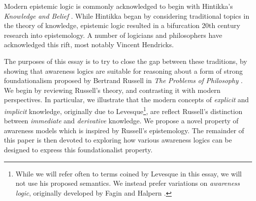 Modern epistemic logic is commonly acknowledged to begin with
Hintikka's \emph{Knowledge and Belief}
\cite{hintikka_knowledge_1969}. While Hintikka began by considering
traditional topics in the theory of knowledge, epistemic logic
resulted in a bifurcation 20th century research into epistemology.  A number of
logicians and philosophers have acknowledged this rift, most notably
Vincent Hendricks\cite{hendricks_wheres_2006,hendricks_mainstream_2006}.

The purposes of this essay is to try to close the gap between these
traditions, by showing that awareness logics are suitable for
reasoning about a form of strong foundationalism proposed
by Bertrand Russell in \emph{The Problems of Philosophy}
\cite{russell_problems_1936}.  We begin by reviewing Russell's
theory, and contrasting it with modern perspectives.  In particular,
we illustrate that the modern concepts of \emph{explicit} and
\emph{implicit} knowledge, originally due to Levesque\footnote{While we will refer often to
  terms coined by Levesque in this essay, we will not use his
  proposed semantics.  We instead prefer variations on
  \emph{awareness logic}, originally developed by Fagin and Halpern
  \cite{fagin_belief_1988}.}\cite{levesque_logic_1984},  are reflect Russell's distinction between \emph{immediate} and \emph{derivative}
knowledge.  We propose a novel property of awareness models which
is inspired by Russell's epistemology.  The
remainder of this paper is then devoted to exploring how various awareness
logics can be designed to express this foundationalist property.

